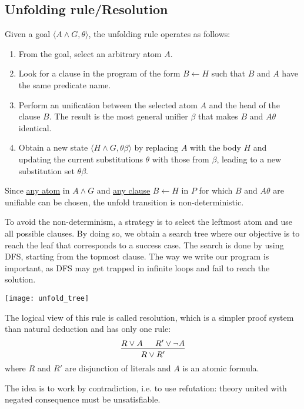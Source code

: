 \documentclass{article}
\begin{document}
\subsection{Unfolding rule/Resolution}\label{unfold_logic}
Given a goal $\langle A\land G,\theta\rangle$, the unfolding rule operates as
follows:
\begin{enumerate}
    \item From the goal, select an arbitrary atom $A$.
    \item Look for a clause in the program of the form $B\leftarrow H$ such
        that $B$ and $A$ have the same predicate name.
    \item Perform an unification between the selected atom $A$ and the head of
        the clause $B$. The result is the most general unifier $\beta$ that
        makes $B$ and $A\theta$ identical.
    \item Obtain a new state $\langle H\land G,\theta\beta\rangle$ by
    replacing $A$ with the body $H$ and updating the current substitutions
    $\theta$ with those from $\beta$, leading to a new substitution set
    $\theta\beta$.
\end{enumerate}

Since \underline{any atom} in $A\land G$ and \underline{any clause}
$B\leftarrow H$ in $P$ for which $B$ and $A \theta$ are unifiable can be
chosen, the unfold transition is non-deterministic.

To avoid the non-determinism, a strategy is to select the leftmost atom and
use all possible clauses. By doing so, we obtain a search tree where our
objective is to reach the leaf that corresponds to a success case. The search
is done by using DFS, starting from the topmost clause. The way we write our
program is important, as DFS may get trapped in infinite loops and fail to
reach the solution.

\begin{center}
    \texttt{[image: unfold\_tree]}
\end{center}

The logical view of this rule is called resolution, which is a simpler proof
system than natural deduction and has only one rule:
$$\begin{prooftree}
    \hypo{R\lor A}\hypo{R'\lor \neg A}
    \infer2{R\lor R'}
\end{prooftree}$$
where $R$ and $R'$ are disjunction of literals and $A$ is an atomic
formula.

The idea is to work by contradiction, i.e. to use refutation: theory
united with negated consequence must be unsatisfiable.
\end{document}
